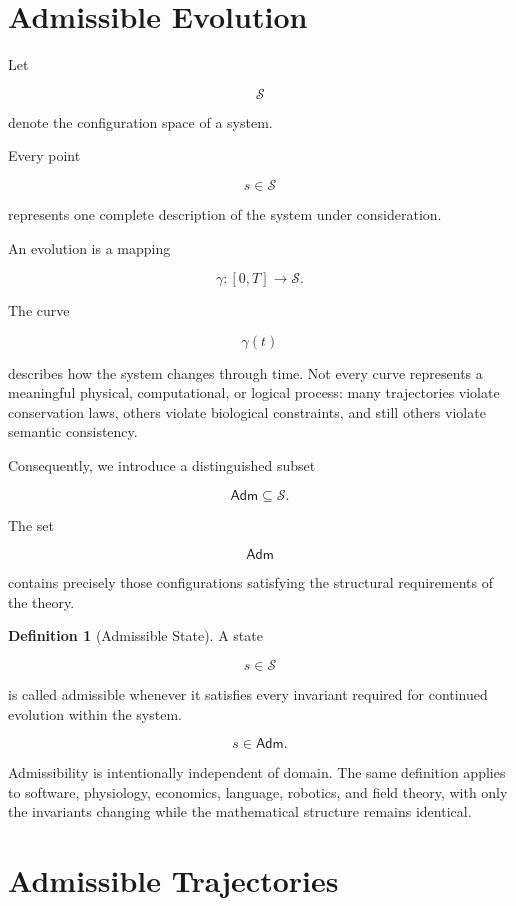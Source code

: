 \documentclass[11pt,oneside]{book}
\numberwithin{equation}{chapter}
\theoremstyle{definition}
\newtheorem{definition}{Definition}[chapter]
\theoremstyle{plain}
\newcommand{\State}{\mathcal{S}}
\newcommand{\Adm}{\mathsf{Adm}}
\begin{document}
\section{Admissible Evolution}

Let

\[
\State
\]

denote the configuration space of a system.

Every point

\[
s \in \State
\]

represents one complete description of the system under consideration.

An evolution is a mapping

\[
\gamma :
[0,T]
\rightarrow
\State.
\]

The curve

\[
\gamma(t)
\]

describes how the system changes through time. Not every curve represents a meaningful physical, computational, or logical process: many trajectories violate conservation laws, others violate biological constraints, and still others violate semantic consistency.

Consequently, we introduce a distinguished subset

\[
\Adm
\subseteq
\State.
\]

The set

\[
\Adm
\]

contains precisely those configurations satisfying the structural
requirements of the theory.

\begin{definition}[Admissible State]

A state

\[
s \in \State
\]

is called admissible whenever it satisfies every invariant required for
continued evolution within the system.

\[
s \in \Adm.
\]

\end{definition}

Admissibility is intentionally independent of domain. The same definition applies to software, physiology, economics, language, robotics, and field theory, with only the invariants changing while the mathematical structure remains identical.

\section{Admissible Trajectories}
\end{document}
